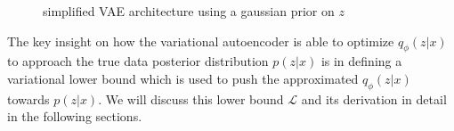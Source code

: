 \begin{figure}[h]
  \centering
  
  \caption{simplified VAE architecture using a gaussian prior on $z$}
  \label{fig:vae_architecture}
\end{figure}

The key insight on how the variational autoencoder is able to optimize $q_\phi(z|x)$ to approach the true data posterior distribution $p(z|x)$ is in defining a variational lower bound which is used to push the approximated $q_\phi(z|x)$ towards $p(z|x)$. We will discuss this lower bound $\mathcal{L}$ and its derivation in detail in the following sections.

\newpage











